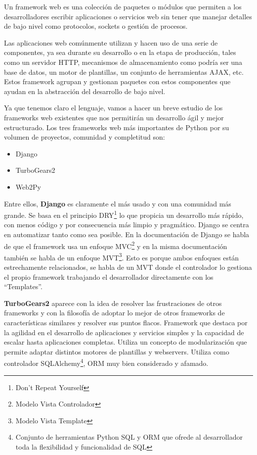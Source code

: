 Un framework web\cite{python_wiki, django_basic} es una colección de paquetes o módulos que permiten a los desarrolladores escribir aplicaciones o servicios web sin tener que manejar detalles de bajo nivel como protocolos, sockets o gestión de procesos.

\bigskip
Las aplicaciones web comúnmente utilizan y hacen uso de una serie de componentes, ya sea durante su desarrollo o en la etapa de producción, tales como un servidor HTTP, mecanismos de almacenamiento como podría ser una base de datos, un motor de plantillas, un conjunto de herramientas AJAX, etc. Estos framework agrupan y gestionan paquetes con estos componentes que ayudan en la abstracción del desarrollo de bajo nivel.

\bigskip
Ya que tenemos claro el lenguaje, vamos a hacer un breve estudio de los frameworks web existentes que nos permitirán un desarrollo ágil y mejor estructurado. Los tres frameworks web más importantes de Python por su volumen de proyectos, comunidad y completitud son:


\begin{itemize}
  \item {Django}
  \item {TurboGears2}
  \item {Web2Py}
\end{itemize}


\bigskip
Entre ellos, \textbf{Django}\cite{django_basic} es claramente el más usado y con una comunidad más grande. Se basa en el principio DRY\footnote{Don't Repeat Yourself} lo que propicia un desarrollo más rápido, con menos código y por consecuencia más limpio y pragmático. Django se centra en automatizar tanto como sea posible. En la documentación de Django se habla de que el framework usa un enfoque MVC\footnote{Modelo Vista Controlador}  y en la misma documentación también se habla de un enfoque MVT\footnote{Modelo Vista Template}. Esto es porque ambos enfoques están estrechamente relacionados, se habla de un MVT donde el controlador lo gestiona el propio framework trabajando el desarrollador directamente con los ``Templates''.

\bigskip
\textbf{TurboGears2}\cite{turbogears} aparece con la idea de resolver las frustraciones de otros frameworks y con la filosofía de adoptar lo mejor de otros frameworks de características similares y resolver sus puntos flacos. Framework que destaca por la agilidad en el desarrollo de aplicaciones y servicios simples y la capacidad de escalar hasta aplicaciones completas. Utiliza un concepto de modularización que permite adaptar distintos motores de plantillas y webservers. Utiliza como controlador SQLAlchemy\footnote{Conjunto de herramientas Python SQL y ORM que ofrede al desarrollador toda la flexibilidad y funcionalidad de SQL}, ORM muy bien considerado y afamado.

